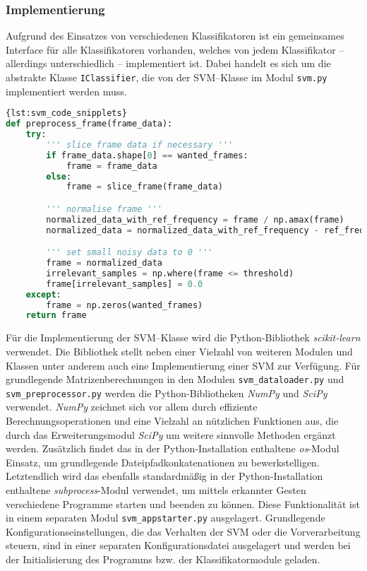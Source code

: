 \subsubsection{Implementierung}\label{sec:svm_implementation}
Aufgrund des Einsatzes von verschiedenen Klassifikatoren ist ein gemeinsames Interface für alle Klassifikatoren vorhanden, welches von jedem Klassifikator -- allerdings unterschiedlich -- implementiert ist. 
Dabei handelt es sich um die abstrakte Klasse \texttt{IClassifier}, die von der \ac{SVM}--Klasse im Modul \texttt{svm.py}  implementiert werden muss.

\begin{lstlisting}[float=*,language=Python,caption={Code Snipplet},label={lst:svm_code_snipplets}]{lst:svm_code_snipplets}
def preprocess_frame(frame_data):
	try:
		''' slice frame data if necessary '''
		if frame_data.shape[0] == wanted_frames:
			frame = frame_data
		else:
			frame = slice_frame(frame_data)

		''' normalise frame '''
		normalized_data_with_ref_frequency = frame / np.amax(frame)
		normalized_data = normalized_data_with_ref_frequency - ref_frequency_frame

		''' set small noisy data to 0 '''
		frame = normalized_data
		irrelevant_samples = np.where(frame <= threshold)
		frame[irrelevant_samples] = 0.0
	except:
		frame = np.zeros(wanted_frames)
	return frame
\end{lstlisting}


Für die Implementierung der \ac{SVM}--Klasse wird die Python-Bibliothek \textit{scikit-learn} verwendet. 
Die Bibliothek stellt neben einer Vielzahl von weiteren Modulen und Klassen unter anderem auch eine Implementierung einer \ac{SVM} zur Verfügung.
Für grundlegende Matrizenberechnungen in den Modulen \texttt{svm\_dataloader.py} und \texttt{svm\_preprocessor.py} werden die Python-Bibliotheken \textit{NumPy} und \textit{SciPy} verwendet. 
\textit{NumPy} zeichnet sich vor allem durch effiziente Berechnungsoperationen und eine Vielzahl an nützlichen Funktionen aus, die durch das Erweiterungsmodul \textit{SciPy} um weitere sinnvolle Methoden ergänzt werden.
Zusätzlich findet das in der Python-Installation enthaltene \textit{os}-Modul Einsatz, um grundlegende Dateipfadkonkatenationen zu bewerkstelligen.
Letztendlich wird das ebenfalls standardmäßig in der Python-Installation enthaltene \textit{subprocess}-Modul verwendet, um mittels erkannter Gesten verschiedene Programme starten und beenden zu können.
Diese Funktionalität ist in einem separaten Modul \texttt{svm\_appstarter.py} ausgelagert.
Grundlegende Konfigurationseinstellungen, die das Verhalten der \ac{SVM} oder die Vorverarbeitung steuern, sind in einer separaten Konfigurationsdatei ausgelagert und werden bei der Initialisierung des Programms bzw. der Klassifikatormodule geladen.

